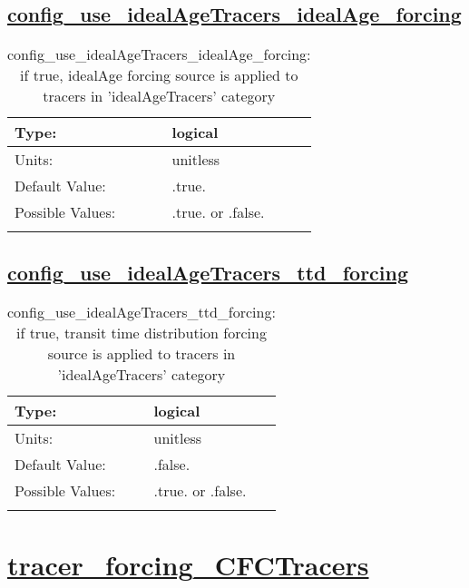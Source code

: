 \subsection[config\_use\_idealAgeTracers\_idealAge\_forcing]{\hyperref[sec:nm_tab_tracer_forcing_idealAgeTracers]{config\_use\_idealAgeTracers\_idealAge\_forcing}}
\label{subsec:nm_sec_config_use_idealAgeTracers_idealAge_forcing}
\begin{center}
\begin{longtable}{| p{2.0in} || p{4.0in} |}
    \hline
    Type: & logical \\
    \hline
    Units: & \si{unitless} \\
    \hline
    Default Value: & .true. \\
    \hline
    Possible Values: & .true. or .false. \\
    \hline
    \caption{config\_use\_idealAgeTracers\_idealAge\_forcing: if true, idealAge forcing source is applied to tracers in 'idealAgeTracers' category}
\end{longtable}
\end{center}
\subsection[config\_use\_idealAgeTracers\_ttd\_forcing]{\hyperref[sec:nm_tab_tracer_forcing_idealAgeTracers]{config\_use\_idealAgeTracers\_ttd\_forcing}}
\label{subsec:nm_sec_config_use_idealAgeTracers_ttd_forcing}
\begin{center}
\begin{longtable}{| p{2.0in} || p{4.0in} |}
    \hline
    Type: & logical \\
    \hline
    Units: & \si{unitless} \\
    \hline
    Default Value: & .false. \\
    \hline
    Possible Values: & .true. or .false. \\
    \hline
    \caption{config\_use\_idealAgeTracers\_ttd\_forcing: if true, transit time distribution forcing source is applied to tracers in 'idealAgeTracers' category}
\end{longtable}
\end{center}
\section[tracer\_forcing\_CFCTracers]{\hyperref[sec:nm_tab_tracer_forcing_CFCTracers]{tracer\_forcing\_CFCTracers}}
\label{sec:nm_sec_tracer_forcing_CFCTracers}
